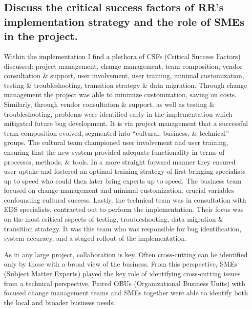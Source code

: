 \documentclass{article}
\begin{document}
\subsection{Discuss the critical success factors of RR's implementation strategy and the role of
SMEs in the project.}
Within the implementation I find a plethora of CSFs (Critical Success Factors) discussed: project management, change management, team composition, vendor consultation \& support, user involvement, user training, minimal customization, testing \& troubleshooting, transition strategy \& data migration. 
Through change management the project was able to minimize customization, saving on costs. 
Similarly, through vendor consultation \& support, as well as testing \& troubleshooting, problems were identified early in the implementation which mitigated future bug development. 
It is via project management that a successful team composition evolved, segmented into ``cultural, business, \& technical'' groups. 
The cultural team championed user involvement and user training, ensuring that the new system provided adequate functionality in terms of processes, methods, \& tools. 
In a more straight forward manner they ensured user uptake and fostered an optimal training strategy of first bringing specialists up to speed who could then later bring experts up to speed. 
The business team focused on change management and minimal customization, crucial variables confounding cultural success. 
Lastly, the technical team was in consultation with EDS specialists, contracted out to perform the implementation. 
Their focus was on the most critical aspects of testing, troubleshooting, data migration \& transition strategy. 
It was this team who was responsible for bug identification, system accuracy, and a staged rollout of the implementation. 

As in any large project, collaboration is key.
Often cross-cutting can be identified only by those with a broad view of the business. 
From this perspective, SMEs (Subject Matter Experts) played the key role of identifying cross-cutting issues from a technical perspective. 
Paired OBUs (Organizational Business Units) with focused change management teams and SMEs together were able to identify both the local and broader business needs. 
\end{document}
